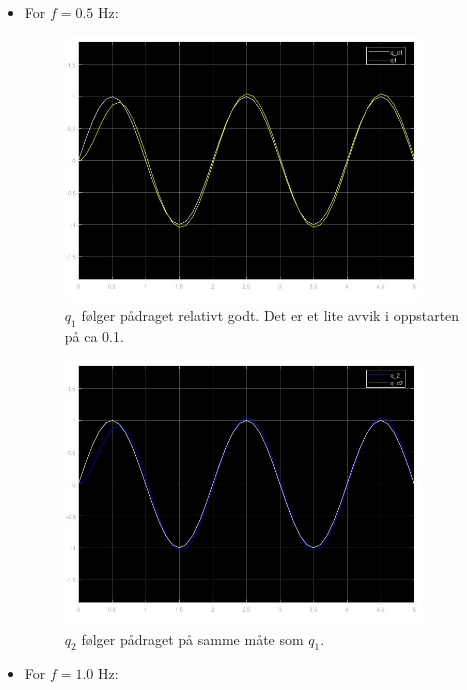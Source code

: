 \documentclass[norsk]{article}
\begin{document}
\subsection{ }
\begin{itemize}
\item For \(f = 0.5\) Hz:
\begin{figure}[H]
\includegraphics[height=7cm]{illustrations/oppg3f_illu1}
\caption{\(q_1\) følger pådraget relativt godt. Det er et lite avvik i oppstarten på ca 0.1.}
\end{figure}
\begin{figure}[H]
\includegraphics[height=7cm]{illustrations/oppg3f_illu2}
\caption{\(q_2\) følger pådraget på samme måte som \(q_1\).}
\end{figure}
\item For \(f = 1.0\) Hz:


\end{itemize}
\end{document}
